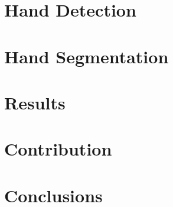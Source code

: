 \documentclass[12pt]{report}
\begin{document}

\tableofcontents\newpage

\chapter{Hand Detection}


\chapter{Hand Segmentation}


\chapter{Results}


\chapter{Contribution}


\chapter{Conclusions}

\end{document}
